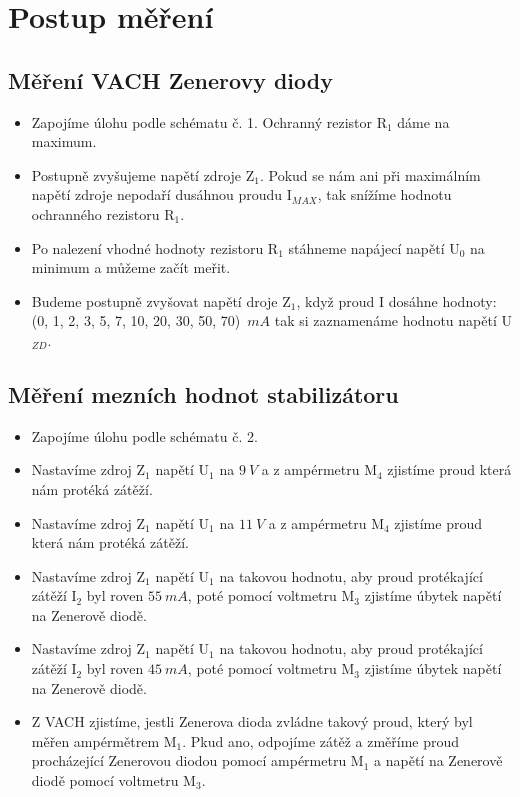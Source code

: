 \section{Postup měření}
  \subsection{Měření VACH Zenerovy diody}
  \begin{itemize}
    \item
      Zapojíme úlohu podle schématu č. 1. Ochranný rezistor R$_1$ dáme na maximum.
    \item
      Postupně zvyšujeme napětí zdroje Z$_1$. Pokud se nám ani při maximálním napětí zdroje nepodaří dusáhnou proudu I$_{MAX}$, tak snížíme hodnotu ochranného rezistoru R$_1$.
    \item
      Po nalezení vhodné hodnoty rezistoru R$_1$ stáhneme napájecí napětí U$_0$ na minimum  a můžeme začít meřit.
    \item
      Budeme postupně zvyšovat napětí droje Z$_1$, když proud I dosáhne hodnoty: (0, 1, 2, 3, 5, 7, 10, 20, 30, 50, 70)~$mA$ tak si zaznamenáme hodnotu napětí U$_{ZD}$.
   \end{itemize}
   
   \subsection{Měření mezních hodnot stabilizátoru}
   \begin{itemize}
    \item
      Zapojíme úlohu podle schématu č. 2.
    \item
      Nastavíme zdroj Z$_1$ napětí U$_1$ na $9~V$ a z ampérmetru M$_4$ zjistíme proud která nám protéká zátěží.
    \item
      Nastavíme zdroj Z$_1$ napětí U$_1$ na $11~V$ a z ampérmetru M$_4$ zjistíme proud která nám protéká zátěží.
     \item
      Nastavíme zdroj Z$_1$ napětí U$_1$ na takovou hodnotu, aby proud protékající zátěží I$_2$ byl roven $55~mA$, poté pomocí voltmetru M$_3$ zjistíme úbytek napětí na Zenerově diodě.
    \item
      Nastavíme zdroj Z$_1$ napětí U$_1$ na takovou hodnotu, aby proud protékající zátěží I$_2$ byl roven $45~mA$, poté pomocí voltmetru M$_3$ zjistíme úbytek napětí na Zenerově diodě.
    \item
      Z VACH zjistíme, jestli Zenerova dioda zvládne takový proud, který byl měřen ampérmětrem M$_1$. Pkud ano, odpojíme zátěž a změříme proud procházející Zenerovou diodou pomocí ampérmetru M$_1$ a napětí na Zenerově diodě pomocí voltmetru M$_3$.
  \end{itemize}

